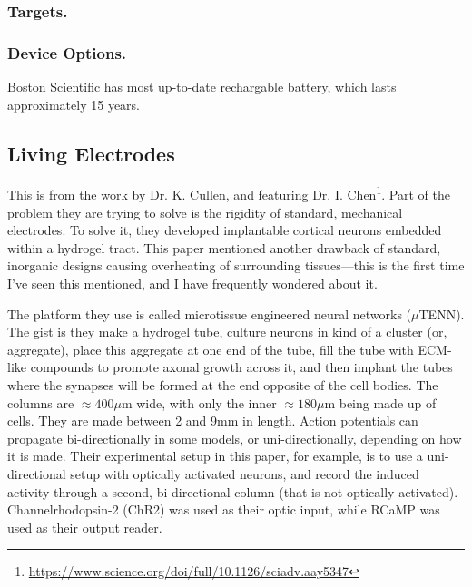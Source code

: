 \subsubsection{Targets.}



\subsubsection{Device Options.}

Boston Scientific has most up-to-date rechargable battery, which lasts approximately 15 years. 
 



\subsection{Living Electrodes}

This is from the work by Dr. K. Cullen, and featuring Dr. I. Chen\footnote{\url{https://www.science.org/doi/full/10.1126/sciadv.aay5347}}. Part of the problem they are trying to solve is the rigidity of standard, mechanical electrodes. To solve it, they developed implantable cortical neurons embedded within a hydrogel tract. This paper mentioned another drawback of standard, inorganic designs causing overheating of surrounding tissues---this is the first time I've seen this mentioned, and I have frequently wondered about it.\newline

The platform they use is called microtissue engineered neural networks ($\mu$TENN). The gist is they make a hydrogel tube, culture neurons in kind of a cluster (or, aggregate), place this aggregate at one end of the tube, fill the tube with ECM-like compounds to promote axonal growth across it, and then implant the tubes where the synapses will be formed at the end opposite of the cell bodies. The columns are $\approx 400\mu$m wide, with only the inner $\approx 180\mu$m being made up of cells. They are made between 2 and 9mm in length. Action potentials can propagate bi-directionally in some models, or uni-directionally, depending on how it is made. Their experimental setup in this paper, for example, is to use a uni-directional setup with optically activated neurons, and record the induced activity through a second, bi-directional column (that is not optically activated). Channelrhodopsin-2 (ChR2) was used as their optic input, while RCaMP was used as their output reader. \newline

